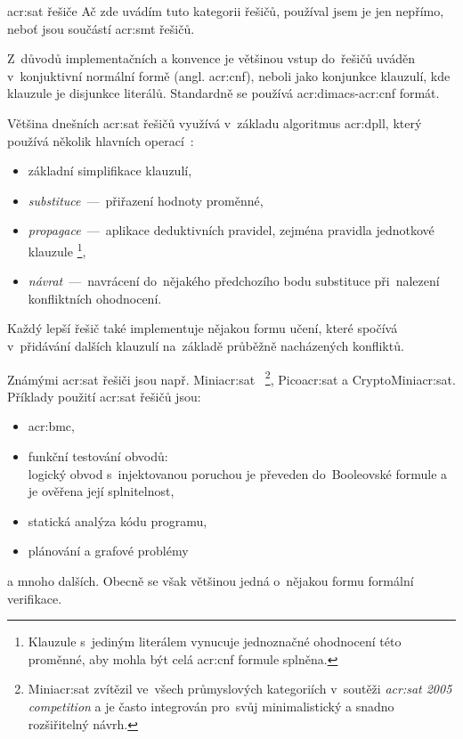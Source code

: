 \documentclass[thesis=M,czech]{FITthesis}[2012/06/26]
\newcommand{\acrlabel}[1]{acr:#1}
\newcommand{\acr}[1]{\acrshort{\acrlabel{#1}}}
\newcommand{\acrf}[1]{\acrfull{\acrlabel{#1}}}
\newcommand{\hl}[1]{\textit{#1}}
\newcommand{\name}[1]{\hl{#1}}
\newcommand{\cit}[1]{\cite{#1}}
\begin{document}
\begin{section}{\acr{sat} řešiče}\label{s:search:sat}
Ač zde uvádím tuto kategorii řešičů,
používal jsem je jen nepřímo,
neboť jsou součástí \acr{smt} řešičů.

Z~důvodů implementačních a konvence
je většinou vstup do~řešičů uváděn
v~konjuktivní normální formě (angl. \acr{cnf}),
neboli jako konjunkce klauzulí,
kde klauzule je disjunkce literálů.
Standardně se používá \acr{dimacs}-\acr{cnf} formát.

Většina dnešních \acr{sat} řešičů
využívá v~základu algoritmus \acrf{dpll},
který používá několik hlavních operací~\cit{smt-de_moura}:
\begin{itemize}
\item základní simplifikace klauzulí,
\item \hl{substituce}~---~přiřazení hodnoty proměnné,
\item \hl{propagace}~---~aplikace deduktivních pravidel,
   zejména pravidla jednotkové klauzule%
   \footnote{Klauzule s~jediným literálem
   vynucuje jednoznačné ohodnocení této proměnné, aby mohla být celá
   \acr{cnf} formule splněna.},
\item \hl{návrat}~---~navrácení do~nějakého předchozího bodu substituce
   při~nalezení konfliktních ohodnocení.
\end{itemize}

Každý lepší řešič také implementuje nějakou formu učení,
které spočívá v~přidávání dalších klauzulí
na~základě průběžně nacházených konfliktů.

Známými \acr{sat} řešiči jsou např. Mini\acr{sat}~\cit{minisat}%
\footnote{Mini\acr{sat} zvítězil
ve~všech průmyslových kategoriích
v~soutěži \name{\acr{sat} 2005 competition}
a je často integrován pro~svůj
minimalistický a snadno rozšiřitelný návrh.},
Pico\acr{sat} a CryptoMini\acr{sat}.
Příklady použití \acr{sat} řešičů jsou:
\begin{itemize}
\item \acrf{bmc},
\item funkční testování obvodů:\\
   logický obvod s~injektovanou poruchou
   je převeden do~Booleovské formule
   a je ověřena její splnitelnost,
\item statická analýza kódu programu,
\item plánování a grafové problémy
\end{itemize}
a mnoho dalších. Obecně se však většinou jedná
o~nějakou formu formální verifikace.
\end{section} %
\end{document}
